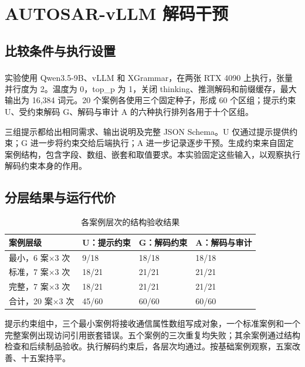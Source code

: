 \documentclass[pdflatex,iicol,sn-mathphys-num]{sn-jnl}
\newcommand{\paperref}[1]{\textsuperscript{\textcolor{citationred}{\citep{#1}}}}
\begin{document}
\FloatBarrier

\setcounter{table}{0}

\section{AUTOSAR-vLLM 解码干预}\label{app:B}

\subsection{比较条件与执行设置}\label{app:B-1}

实验使用 Qwen3.5-9B、vLLM\paperref{Kwon_2023} 和 XGrammar\paperref{MLSYS2025_5c20ca4b}，在两张 RTX 4090 上执行，张量并行度为 2。温度为 0，top\_p 为 1，关闭 thinking、推测解码和前缀缓存，最大输出为 16,384 词元。20 个案例各使用三个固定种子，形成 60 个区组；提示约束 U、受约束解码 G、解码与审计 A 的六种执行排列各用于十个区组。


三组提示都给出相同需求、输出说明及完整 JSON Schema。U 仅通过提示提供约束；G 进一步将约束交给后端执行；A 进一步记录逐步干预。生成约束来自固定案例结构，包含字段、数组、嵌套和取值要求。本实验固定这些输入，以观察执行解码约束本身的作用。


\subsection{分层结果与运行代价}\label{app:B-2}

\begin{table}[!htbp]
\centering
\caption{各案例层次的结构验收结果}\label{tab:B1}
\small
\setlength{\tabcolsep}{4pt}
\renewcommand{\arraystretch}{1.20}
\begin{tabularx}{\columnwidth}{@{}L L L L@{}}
\toprule
\textbf{案例层级} & \textbf{U：提示约束} & \textbf{G：解码约束} & \textbf{A：解码与审计} \\
\midrule
最小，6 案\ensuremath{\times}3 次 & 9/18 & 18/18 & 18/18 \\
标准，7 案\ensuremath{\times}3 次 & 18/21 & 21/21 & 21/21 \\
完整，7 案\ensuremath{\times}3 次 & 18/21 & 21/21 & 21/21 \\
合计，20 案\ensuremath{\times}3 次 & 45/60 & 60/60 & 60/60 \\
\bottomrule
\end{tabularx}
\end{table}

提示约束组中，三个最小案例将接收通信属性数组写成对象，一个标准案例和一个完整案例出现访问引用嵌套错误。五个案例的三次重复均失败；其余案例通过结构检查和后续制品验收。执行解码约束后，各层次均通过。按基础案例观察，五案改善、十五案持平。
\end{document}
